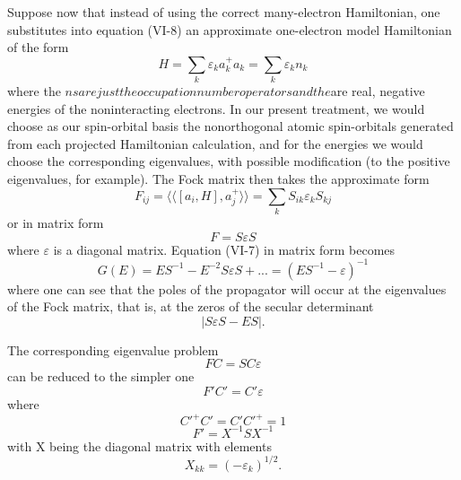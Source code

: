 \documentclass[12pt,letterpaper]{report}
\begin{document}
Suppose now that instead of using the correct many-electron Hamiltonian, one substitutes into equation (VI-8) an approximate one-electron model Hamiltonian of the form
\begin{equation}
H = \sum_k \varepsilon_k a_k^+ a_k = \sum_k \varepsilon_k n_k
\end{equation}
where the $ns are just the occupation number operators and the $\varepsilons are real, negative energies of the noninteracting electrons. In our present treatment, we would choose as our spin-orbital basis the nonorthogonal atomic spin-orbitals generated from each projected Hamiltonian calculation, and for the energies we would choose the corresponding eigenvalues, with possible modification (to the positive eigenvalues, for example). The Fock matrix then takes the approximate form
\begin{equation}
F_{ij} = \langle\langle [a_i, H], a_j^+ \rangle\rangle = \sum_k S_{ik} \varepsilon_k S_{kj}
\end{equation}
or in matrix form
\begin{equation}
F = S\varepsilon S
\end{equation}
where $\varepsilon$ is a diagonal matrix. Equation (VI-7) in matrix form becomes
\begin{equation}
G(E) = ES^{-1} - E^{-2}S\varepsilon S + ... = (ES^{-1} - \varepsilon)^{-1}
\end{equation}
where one can see that the poles of the propagator will occur at the eigenvalues of the Fock matrix, that is, at the zeros of the secular determinant
\begin{equation}
|S\varepsilon S - ES|.
\end{equation}

The corresponding eigenvalue problem
\begin{equation}
FC = SC\varepsilon
\end{equation}
can be reduced to the simpler one
\begin{equation}
F'C' = C'\varepsilon
\end{equation}
where
\begin{equation}
C'^+ C' = C'C'^+ = 1
\end{equation}
\begin{equation}
F' = X^{-1}SX^{-1}
\end{equation}
with X being the diagonal matrix with elements
\begin{equation}
X_{kk} = (-\varepsilon_k)^{1/2}.
\end{equation}
\end{document}
